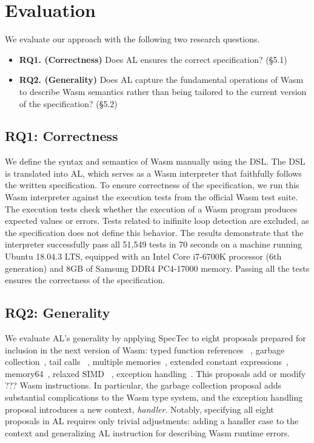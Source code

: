 
\chapter{Evaluation}
\label{ch:eval}
\noindent

We evaluate our approach with the following two research questions.
\begin{itemize}
  \item \textbf{RQ1. (Correctness)} Does AL ensures the correct specification?
    (\S 5.1)
  \item \textbf{RQ2. (Generality)} Does AL capture the fundamental operations of
    Wasm to describe Wasm semantics rather than being tailored to the current
    version of the specification? (\S 5.2)
\end{itemize}

\section{RQ1: Correctness}

We define the syntax and semantics of Wasm manually using the DSL.
The DSL is translated into AL, which serves as a Wasm interpreter that
faithfully follows the written specification.
To ensure correctness of the specification, we run this Wasm interpreter
against the execution tests from the official Wasm test suite.
The execution tests check whether the execution of a Wasm program produces
expected values or errors.
Tests related to inifinite loop detection are excluded, as the specification
does not define this behavior.
The results demonstrate that the interpreter successfully pass all 51,549 tests
in 70 seconds on a machine running Ubuntu 18.04.3 LTS, equipped with an Intel
Core i7-6700K processor (6th generation) and 8GB of Samsung DDR4 PC4-17000
memory.
Passing all the tests ensures the correctness of the specification.


\section{RQ2: Generality}
We evaluate AL's generality by applying SpecTec to eight proposals prepared for
inclusion in the next version of Wasm: typed function references
~\cite{proposal-fr}, garbage collection~\cite{propsal-gc}, tail calls
~\cite{proposal-tc}, multiple memories~\cite{proposal-mm}, extended constant
expressions~\cite{proposal-ec}, memory64~\cite{proposal-m64}, relaxed SIMD
~\cite{proposal-rs}, exception handling~\cite{proposal-eh}.
This proposals add or modify ??? Wasm instructions.
In particular, the garbage collection proposal adds substantial complications
to the Wasm type system, and the exception handling proposal introduces a new
context, \textit{handler}.
Notably, specifying all eight proposals in AL requires only trivial
adjustments: adding a handler case to the context and generalizing AL
instruction for describing Wasm runtime errors.

